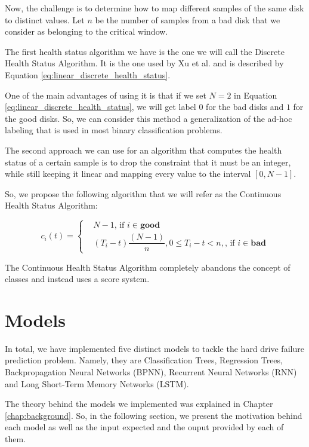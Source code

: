 Now, the challenge is to determine how to map different samples of the same disk to distinct values.
Let $n$ be the number of samples from a bad disk that we consider as belonging to the critical window.

The first health status algorithm we have is the one we will call the Discrete Health Status Algorithm.
It is the one used by Xu et al. \cite{Xu16} and is described by Equation \ref{eq:linear_discrete_health_status}.

One of the main advantages of using it is that if we set $N = 2$ in Equation \ref{eq:linear_discrete_health_status}, we will get label $0$ for the bad disks and $1$ for the good disks.
So, we can consider this method a generalization of the ad-hoc labeling that is used in most binary classification problems.

The second approach we can use for an algorithm that computes the health status of a certain sample is to drop the constraint that it must be an integer, while still keeping it linear and mapping every value to the interval $[0,N-1]$.

So, we propose the following algorithm that we will refer as the Continuous Health Status Algorithm:

\begin{equation}\label{eq:continuous_health_status}
  c_i(t) = 
  \begin{cases}
    & N - 1 \text{, if } i \in \mathbf{good} \\
    & (T_i-t)\dfrac{(N-1)}{n}, 0 \leq T_i - t < n, \text{, if } i \in \mathbf{bad}
  \end{cases}
\end{equation}

The Continuous Health Status Algorithm completely abandons the concept of classes and instead uses a score system.

\section{Models}\label{sec:models}

In total, we have implemented five distinct models to tackle the hard drive failure prediction problem.
Namely, they are Classification Trees, Regression Trees, Backpropagation Neural Networks (BPNN), Recurrent Neural Networks (RNN) and Long Short-Term Memory Networks (LSTM).

The theory behind the models we implemented was explained in Chapter \ref{chap:background}. 
So, in the following section, we present the motivation behind each model as well as the input expected and the ouput provided by each of them.

